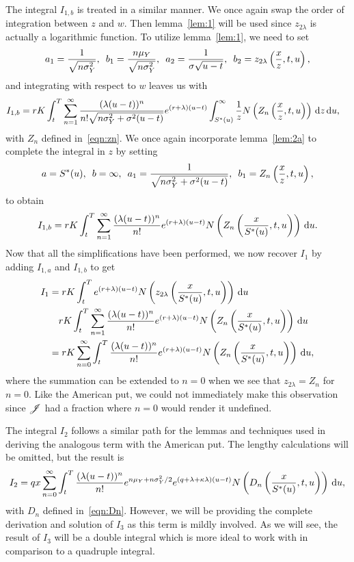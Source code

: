         	The integral $I_{1,b}$ is treated in a similar manner. We once again swap the order of integration between $z$ and $w$. Then lemma~\ref{lem:1} will be used since $z_{2\lambda}$ is actually a logarithmic function. To utilize lemma~\ref{lem:1}, we need to set
        		$$
        			a_1 = \frac{1}{\sqrt{n\sigma_Y^2}}, \enskip b_1 = \frac{n\mu_Y}{\sqrt{n\sigma_Y^2}}, \enskip
        			a_2 = \frac{1}{\sigma\sqrt{u-t}}, \enskip b_2 = z_{2\lambda}\left( \frac{x}{z}, t, u\right),
        		$$
	and integrating with respect to $w$ leaves us with
			\begin{align*}
				I_{1,b} &= rK  \int_t^T  \displaystyle\sum\limits_{n=1}^{\infty} \frac{(\lambda(u-t))^n}{n!\sqrt{n\sigma_Y^2 + \sigma^2(u-t)}}  e^{(r+\lambda)(u-t)} \int_{S^*(u)}^\infty \frac{1}{z}  N\left(Z_n \left( \frac{x}{z},t,u  \right) \right) \,\mathrm d z \, \mathrm d u,
			\end{align*}
	with $Z_n$ defined in~\eqref{eqn:zn}. We once again incorporate lemma~\ref{lem:2a} to complete the integral in $z$ by setting 
		$$
			a = S^*(u), \enskip b = \infty, \enskip a_1 = \frac{1}{\sqrt{n\sigma_Y^2 + \sigma^2(u-t)}}, \enskip
			b_1 = Z_n\left( \frac{x}{z}, t, u \right),
		$$
		to obtain
		$$
			I_{1,b} = rK  \int_t^T  \displaystyle\sum\limits_{n=1}^{\infty} \frac{(\lambda(u-t))^n}{n!}  e^{(r+\lambda)(u-t)} N\left(Z_n \left( \frac{x}{S^*(u)},t,u  \right) \right) \, \mathrm d u.
		$$
		Now that all the simplifications have been performed, we now recover $I_1$ by adding $I_{1,a}$ and $I_{1,b}$ to get
		\begin{align}
			I_1 &= rK\int_t^T e^{(r+\lambda)(u-t)}N\left(z_{2\lambda}\left( \frac{x}{S^*(u)},t,u\right) \right) \, \mathrm d u \nonumber \\
			 &\quad rK  \int_t^T  \displaystyle\sum\limits_{n=1}^{\infty} \frac{(\lambda(u-t))^n}{n!}  e^{(r+\lambda)(u-t)} N\left(Z_n \left( \frac{x}{S^*(u)},t,u  \right) \right) \, \mathrm d u \nonumber \\
			 &= rK \displaystyle\sum\limits_{n=0}^{\infty}\int_t^T  \frac{(\lambda(u-t))^n}{n!} e^{(r+\lambda)(u-t)} N\left(Z_n \left( \frac{x}{S^*(u)},t,u  \right) \right) \, \mathrm d u, \label{eqn:I1call}
		\end{align}
		where the summation can be extended to $n=0$ when we see that $z_{2\lambda} = Z_n$ for $n=0$. Like the American put, we could not immediately make this observation since $\mathscr J$ had a fraction where $n=0$ would render it undefined. 
		
		The integral $I_2$ follows a similar path for the lemmas and techniques used in deriving the analogous term with the American put. The lengthy calculations will be omitted, but the result is
        	\begin{equation}
        		\label{eqn:I2put}
        		I_2 = qx  \displaystyle\sum\limits_{n=0}^{\infty}\int_t^T   \frac{(\lambda(u-t))^n}{n!} e^{n\mu_Y + n\sigma_Y^2/2} e^{(q+\lambda + \kappa\lambda)(u-t)} N\left( D_n \left( \frac{x}{S^*(u)},t,u  \right) \right) \, \mathrm d u,
        	\end{equation}
	with $D_n$ defined in~\eqref{eqn:Dn}. 
	However, we will be providing the complete derivation and solution of $I_3$ as this term is mildly involved. As we will see, the result of $I_3$ will be a double integral which is more ideal to work with in comparison to a quadruple integral. 
	
